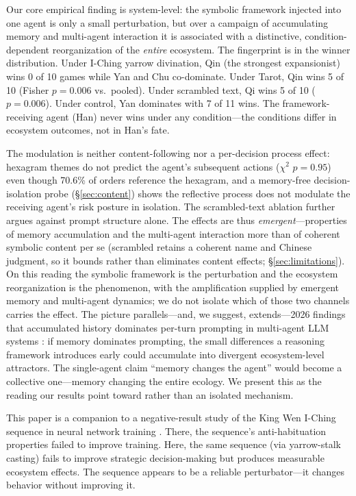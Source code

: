 \documentclass[11pt]{article}
\begin{document}
Our core empirical finding is system-level: the symbolic framework injected into one agent is only a small perturbation, but over a campaign of accumulating memory and multi-agent interaction it is associated with a distinctive, condition-dependent reorganization of the \emph{entire} ecosystem. The fingerprint is in the winner distribution. Under I-Ching yarrow divination, Qin (the strongest expansionist) wins 0 of 10 games while Yan and Chu co-dominate. Under Tarot, Qin wins 5 of 10 (Fisher $p = 0.006$ vs.\ pooled). Under scrambled text, Qi wins 5 of 10 ($p = 0.006$). Under control, Yan dominates with 7 of 11 wins. The framework-receiving agent (Han) never wins under any condition---the conditions differ in ecosystem outcomes, not in Han's fate.

The modulation is neither content-following nor a per-decision process effect: hexagram themes do not predict the agent's subsequent actions ($\chi^2$ $p = 0.95$) even though 70.6\% of orders reference the hexagram, and a memory-free decision-isolation probe (\S\ref{sec:content}) shows the reflective process does not modulate the receiving agent's risk posture in isolation. The scrambled-text ablation further argues against prompt structure alone. The effects are thus \emph{emergent}---properties of memory accumulation and the multi-agent interaction more than of coherent symbolic content per se (scrambled retains a coherent name and Chinese judgment, so it bounds rather than eliminates content effects; \S\ref{sec:limitations}). On this reading the symbolic framework is the perturbation and the ecosystem reorganization is the phenomenon, with the amplification supplied by emergent memory and multi-agent dynamics; we do not isolate which of those two channels carries the effect. The picture parallels---and, we suggest, extends---2026 findings that accumulated history dominates per-turn prompting in multi-agent LLM systems \citep{MemoryCurse2026}: if memory dominates prompting, the small differences a reasoning framework introduces early could accumulate into divergent ecosystem-level attractors. The single-agent claim ``memory changes the agent'' would become a collective one---memory changing the entire ecology. We present this as the reading our results point toward rather than an isolated mechanism.

This paper is a companion to a negative-result study of the King Wen I-Ching sequence in neural network training \citep{Chan2026kingwen}. There, the sequence's anti-habituation properties failed to improve training. Here, the same sequence (via yarrow-stalk casting) fails to improve strategic decision-making but produces measurable ecosystem effects. The sequence appears to be a reliable perturbator---it changes behavior without improving it.
\end{document}

